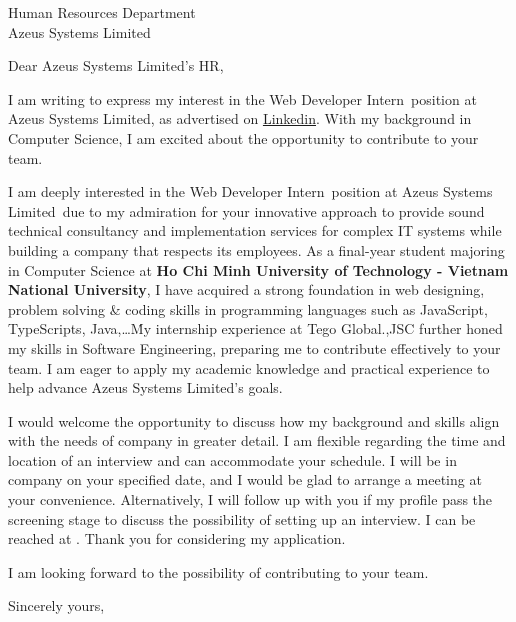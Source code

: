 \documentclass[
	parskip=half, %
	enlargefirstpage=true, %
]{scrlttr2} %
\newcommand{\TOHRNAME}{}
\newcommand{\TOPOSITION}{Human Resources Department}
\newcommand{\TOCOMPANY}{Azeus Systems Limited}
\newcommand{\TOLOCATION}{}
\newcommand{\COMPANYSERVICE}{provide sound technical consultancy and implementation services for complex IT systems while building a company that respects its employees}
\newcommand{\JOBTITLE}{Web Developer Intern}
\newcommand{\COMPANY}{\TOCOMPANY}
\newcommand{\JOBBOARD}{\href{https://www.linkedin.com/jobs/view/4038699158}{Linkedin}}
\newcommand{\MYFIELD}{Computer Science}
\begin{document}

\begin{letter}{
	\TOPOSITION \\
	\TOCOMPANY \\
	\TOLOCATION
}

\opening{Dear \TOCOMPANY's HR,}

I am writing to express my interest in the \JOBTITLE\ position at \COMPANY, as advertised on \JOBBOARD. With my background in \MYFIELD, I am excited about the opportunity to contribute to your team.

I am deeply interested in the \JOBTITLE\ position at \COMPANY\ due to my admiration for your innovative approach to \COMPANYSERVICE. As a final-year student majoring in Computer Science at \textbf{Ho Chi Minh University of Technology - Vietnam National University}, I have acquired a strong foundation in 
web designing, problem solving \& coding skills in programming languages such as JavaScript, TypeScripts, Java,\dots\. My internship experience at Tego Global.,JSC further honed my skills in Software Engineering, preparing me to contribute effectively to your team. I am eager to apply my academic knowledge and practical experience to help advance \COMPANY's goals.

I would welcome the opportunity to discuss how my background and skills align with the needs of company in greater detail. I am flexible regarding the time and location of an interview and can accommodate your schedule. I will be in company on your specified date, and I would be glad to arrange a meeting at your convenience. Alternatively, I will follow up with you if my profile pass the screening stage to discuss the possibility of setting up an interview. I can be reached at . Thank you for considering my application.

I am looking forward to the possibility of contributing to your team.

Sincerely yours, \\


\end{letter}
\end{document}

